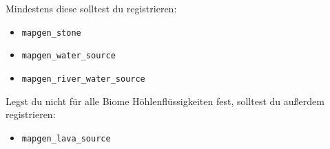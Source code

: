 \begin{Shaded}
\begin{Highlighting}[]
\OperatorTok{(}\OperatorTok{,} \OperatorTok{)}
\end{Highlighting}
\end{Shaded}

Mindestens diese solltest du registrieren:

\begin{itemize}
\tightlist
\item
  \texttt{mapgen\_\allowbreak{}stone}
\item
  \texttt{mapgen\_\allowbreak{}water\_\allowbreak{}source}
\item
  \texttt{mapgen\_\allowbreak{}river\_\allowbreak{}water\_\allowbreak{}source}
\end{itemize}

Legst du nicht für alle Biome Höhlenflüssigkeiten fest, solltest du
außerdem registrieren:

\begin{itemize}
\tightlist
\item
  \texttt{mapgen\_\allowbreak{}lava\_\allowbreak{}source}
\end{itemize}
